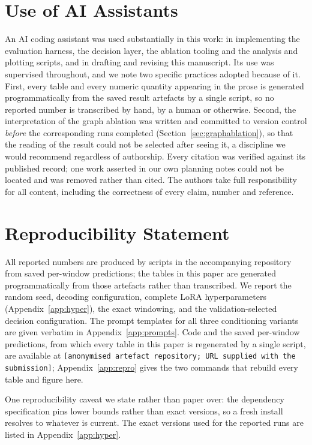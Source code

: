\documentclass[10pt,twocolumn]{article}
\newcommand{\coderepo}{\texttt{[anonymised artefact repository; URL supplied
with the submission]}}
\begin{document}
\section*{Use of AI Assistants}
An AI coding assistant was used substantially in this work: in implementing the
evaluation harness, the decision layer, the ablation tooling and the analysis
and plotting scripts, and in drafting and revising this manuscript. Its use was
supervised throughout, and we note two specific practices adopted because of it.
First, every table and every numeric quantity appearing in the prose is
generated programmatically from the saved result artefacts by a single script,
so no reported number is transcribed by hand, by a human or otherwise. Second,
the interpretation of the graph ablation was written and committed to version
control \emph{before} the corresponding runs completed
(Section~\ref{sec:graphablation}), so that the reading of the result could not be
selected after seeing it, a discipline we would recommend regardless of
authorship. Every citation was verified against its published record; one work
asserted in our own planning notes could not be located and was removed rather
than cited. The authors take full responsibility for all content, including the
correctness of every claim, number and reference.

\section*{Reproducibility Statement}
All reported numbers are produced by scripts in the accompanying repository from
saved per-window predictions; the tables in this paper are generated
programmatically from those artefacts rather than transcribed. We report the
random seed, decoding configuration, complete LoRA hyperparameters
(Appendix~\ref{app:hyper}), the exact windowing, and the validation-selected
decision configuration. The prompt templates for all three conditioning variants
are given verbatim in Appendix~\ref{app:prompts}. Code and the saved per-window
predictions, from which every table in this paper is regenerated by a single
script, are available at \coderepo{}; Appendix~\ref{app:repro} gives the two
commands that rebuild every table and figure here.

One reproducibility caveat we state rather than paper over: the dependency
specification pins lower bounds rather than exact versions, so a fresh install
resolves to whatever is current. The exact versions used for the reported runs
are listed in Appendix~\ref{app:hyper}.
\end{document}
